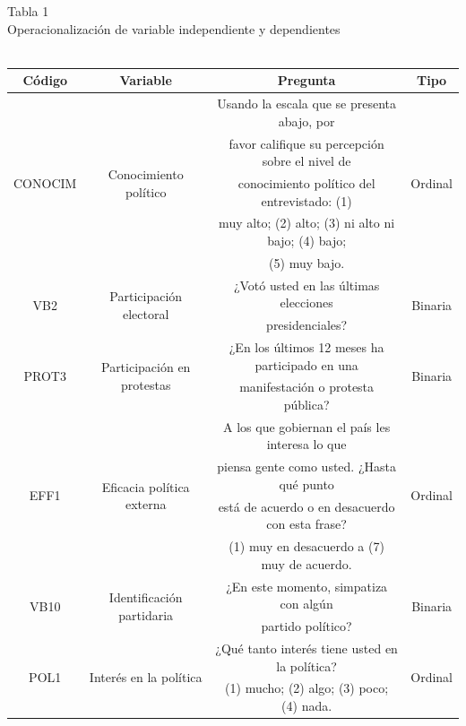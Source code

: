 \documentclass[a4paper]{tufte-handout}
\begin{document}
\begin{table}[h]
  \centering
  \selectfont
   \smallskip\noindent\small Tabla 1 \\ Operacionalización de variable independiente y dependientes \\~\\
  \begin{tabular}{c c c c}
    \toprule
    Código & Variable & Pregunta & Tipo \\
    \midrule
    \multirow{5}{*}{CONOCIM} & \multirow{5}{*}{Conocimiento político} & Usando la escala que se presenta abajo, por  & \multirow{5}{*}{Ordinal}\\
    & & favor califique su percepción sobre el nivel de  &\\
    & & conocimiento político del entrevistado: (1) &\\
    & & muy alto; (2) alto; (3) ni alto ni bajo; (4) bajo;  &\\
    & & (5) muy bajo. & \\ \midrule
    \multirow{2}{*}{VB2} & \multirow{2}{*}{Participación electoral} & ¿Votó usted en las últimas elecciones & \multirow{2}{*}{Binaria}\\
    & & presidenciales? & \\ \midrule
    \multirow{2}{*}{PROT3} & \multirow{2}{*}{Participación en protestas} & ¿En los últimos 12 meses ha participado en una & \multirow{2}{*}{Binaria} \\
    & & manifestación o protesta pública? & \\ \midrule
    \multirow{4}{*}{EFF1} & \multirow{4}{*}{Eficacia política externa} & A los que gobiernan el país les interesa lo que  & \multirow{4}{*}{Ordinal}  \\
    & & piensa gente como usted. ¿Hasta qué punto  & \\
    & & está de acuerdo o en desacuerdo con esta frase? & \\
    & & (1) muy en desacuerdo a (7) muy de acuerdo. & \\ \midrule
    \multirow{2}{*}{VB10} & \multirow{2}{*}{Identificación partidaria} & ¿En este momento, simpatiza con algún &  \multirow{2}{*}{Binaria} \\
    & & partido político? & \\ \midrule
    \multirow{2}{*}{POL1} & \multirow{2}{*}{Interés en la política} & ¿Qué tanto interés tiene usted en la política? & \multirow{2}{*}{Ordinal} \\
    & & (1) mucho; (2) algo; (3) poco; (4) nada.  & \\ \midrule

\end{tabular}
\end{table}
\end{document}
